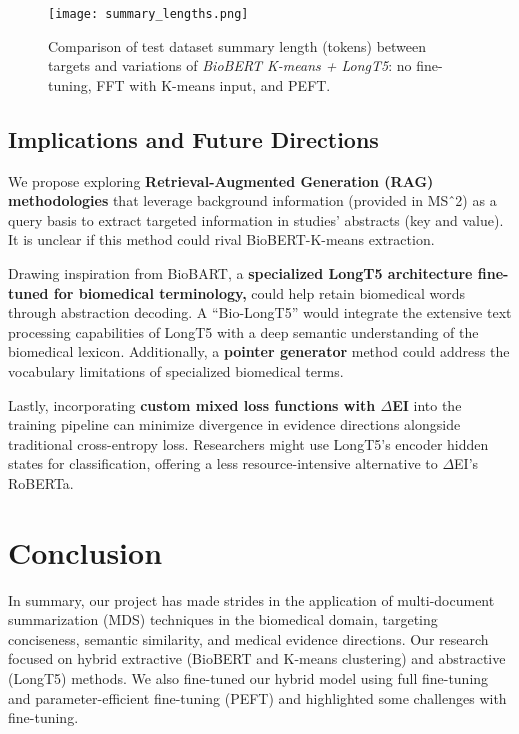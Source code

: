 \documentclass[11pt]{article}
\begin{document}
\begin{figure}[h!]
    \centering
    \texttt{[image: summary\_lengths.png]}
    \caption{Comparison of test dataset summary length (tokens) between targets and variations of \textit{BioBERT K-means + LongT5}: no fine-tuning, FFT with K-means input, and PEFT.}
    \label{fig:summary_lengths_comparison}
\end{figure}
\vspace{-15pt} %


\subsection{Implications and Future Directions}

We propose exploring \textbf{Retrieval-Augmented Generation (RAG) methodologies} that leverage background information (provided in MSˆ2) as a query basis to extract targeted information in studies’ abstracts (key and value). It is unclear if this method could rival BioBERT-K-means extraction.

Drawing inspiration from BioBART, a \textbf{specialized LongT5 architecture fine-tuned for biomedical terminology,} could help retain biomedical words through abstraction decoding. A “Bio-LongT5” would integrate the extensive text processing capabilities of LongT5 with a deep semantic understanding of the biomedical lexicon. Additionally, a \textbf{pointer generator} method could address the vocabulary limitations of specialized biomedical terms.

Lastly, incorporating \textbf{custom mixed loss functions with $\Delta$EI} into the training pipeline can minimize divergence in evidence directions alongside traditional cross-entropy loss. Researchers might use LongT5's encoder hidden states for classification, offering a less resource-intensive alternative to $\Delta$EI’s RoBERTa.

\section{Conclusion}
In summary, our project has made strides in the application of multi-document summarization (MDS) techniques in the biomedical domain, targeting conciseness, semantic similarity, and medical evidence directions. Our research focused on hybrid extractive (BioBERT and K-means clustering) and abstractive (LongT5) methods. We also fine-tuned our hybrid model using full fine-tuning and parameter-efficient fine-tuning (PEFT) and highlighted some challenges with fine-tuning.
\end{document}
